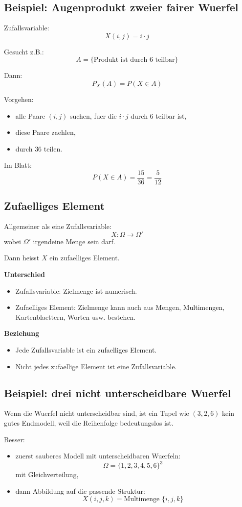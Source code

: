 \documentclass[a4paper,11pt]{article}
\begin{document}
\subsection{Beispiel: Augenprodukt zweier fairer Wuerfel}
Zufallsvariable:
\[
X(i,j)=i\cdot j
\]

Gesucht z.B.:
\[
A=\{\text{Produkt ist durch } 6 \text{ teilbar}\}
\]

Dann:
\[
P_X(A)=P(X\in A)
\]

Vorgehen:
\begin{itemize}
  \item alle Paare $(i,j)$ suchen, fuer die $i\cdot j$ durch $6$ teilbar ist,
  \item diese Paare zaehlen,
  \item durch $36$ teilen.
\end{itemize}

Im Blatt:
\[
P(X\in A)=\frac{15}{36}=\frac{5}{12}
\]

\subsection{Zufaelliges Element}
Allgemeiner als eine Zufallsvariable:
\[
X : \Omega \to \Omega'
\]
wobei $\Omega'$ irgendeine Menge sein darf.

Dann heisst $X$ ein zufaelliges Element.

\textbf{Unterschied}
\begin{itemize}
  \item Zufallsvariable: Zielmenge ist numerisch.
  \item Zufaelliges Element: Zielmenge kann auch aus Mengen, Multimengen, Kartenblaettern, Worten usw. bestehen.
\end{itemize}

\textbf{Beziehung}
\begin{itemize}
  \item Jede Zufallsvariable ist ein zufaelliges Element.
  \item Nicht jedes zufaellige Element ist eine Zufallsvariable.
\end{itemize}

\subsection{Beispiel: drei nicht unterscheidbare Wuerfel}
Wenn die Wuerfel nicht unterscheidbar sind, ist ein Tupel wie $(3,2,6)$ kein gutes Endmodell, weil die Reihenfolge bedeutungslos ist.

Besser:
\begin{itemize}
  \item zuerst sauberes Modell mit unterscheidbaren Wuerfeln:
  \[
  \Omega=\{1,2,3,4,5,6\}^3
  \]
  mit Gleichverteilung,
  \item dann Abbildung auf die passende Struktur:
  \[
  X(i,j,k)=\text{Multimenge } \{i,j,k\}
  \]
\end{itemize}
\end{document}
